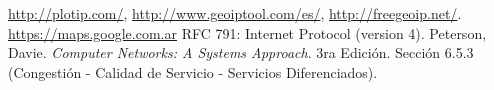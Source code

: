 
\begin{thebibliography}{X}
 \url{http://plotip.com/}, \url{http://www.geoiptool.com/es/}, \url{http://freegeoip.net/}.
 \url{https://maps.google.com.ar}
 RFC 791: Internet Protocol (version 4).
 Peterson, Davie. \emph{Computer Networks: A Systems Approach}. 3ra Edición. Sección 6.5.3 (Congestión - Calidad de Servicio - Servicios Diferenciados).

\end{thebibliography}